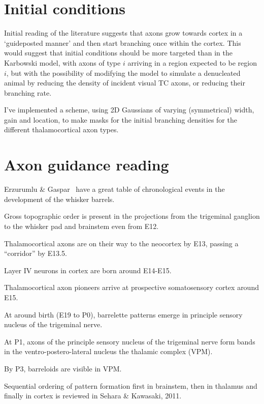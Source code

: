 \documentclass[11pt, a4paper]{article}
\begin{document}
\section{Initial conditions}

Initial reading of the literature suggests that axons grow towards
cortex in a `guideposted manner' and then start branching once within
the cortex. This would suggest that initial conditions should be more
targeted than in the Karbowski model, with axons of type $i$ arriving
in a region expected to be region $i$, but with the possibility of
modifying the model to simulate a denucleated animal by reducing the
density of incident visual TC axons, or reducing their branching rate.

I've implemented a scheme, using 2D Gaussians of varying (symmetrical)
width, gain and location, to make masks for the initial branching
densities for the different thalamocortical axon types.

\section{Axon guidance reading}

Erzurumlu \& Gaspar~\cite{erzurumlu_development_2012} have a great
table of chronological events in the development of the whisker
barrels.

Gross topographic order is present in the projections from the
trigeminal ganglion to the whisker pad and brainstem even from E12.

Thalamocortical axons are on their way to the neocortex by E13,
passing a ``corridor'' by E13.5.

Layer IV neurons in cortex are born around E14-E15.

Thalamocortical axon pioneers arrive at prospective somatosensory
cortex around E15.

At around birth (E19 to P0), barrelette patterns emerge in principle
sensory nucleus of the trigeminal nerve.

At P1, axons of the principle sensory nucleus of the trigeminal nerve
form bands in the ventro-postero-lateral nucleus the thalamic complex
(VPM).

By P3, barreloids are visible in VPM.

Sequential ordering of pattern formation first in brainstem, then in
thalamus and finally in cortex is reviewed in Sehara \& Kawasaki, 2011.
\end{document}
